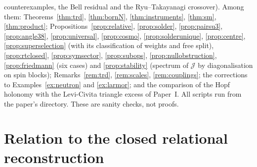 \documentclass[aps,pra,onecolumn,superscriptaddress,nofootinbib,10pt]{revtex4-2}
\theoremstyle{definition}
\theoremstyle{remark}
\begin{document}
{counterexamples, the Bell residual and the Ryu--Takayanagi crossover).  Among them: Theorems~\ref{thm:trd}, \ref{thm:bornN}, \ref{thm:instruments}, \ref{thm:sm},
\ref{thm:product}; Propositions~\ref{prop:relative}, \ref{prop:solder}, \ref{prop:pairsu3}, \ref{prop:angle38},
\ref{prop:universal}, \ref{prop:cosmo}, \ref{prop:solderunique}, \ref{prop:centre}, \ref{prop:superselection} (with its
classification of weights and free split), \ref{prop:rtclosed}, \ref{prop:symsector}, \ref{prop:subops},
\ref{prop:nullobstruction}, \ref{prop:friedmann} (six cases) and \ref{prop:stability} (spectrum of $\mathcal J$ by
diagonalisation on spin blocks); Remarks~\ref{rem:trd}, \ref{rem:scales}, \ref{rem:couplings}; the corrections to
Examples~\ref{ex:neutron} and \ref{ex:larmor}; and the comparison of the Hopf holonomy with the Levi-Civita
triangle excess of Paper~I.  All scripts run from the paper's directory.  These are sanity checks, not
proofs.\par}

\appendix
\section{Relation to the closed relational reconstruction}\label{sec:crqo}
\end{document}
